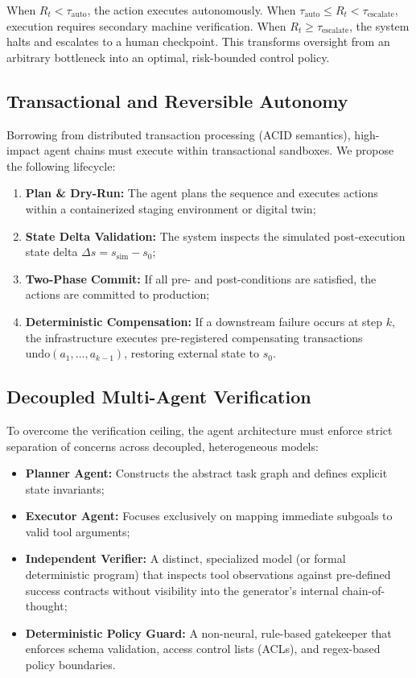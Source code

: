 \documentclass[conference]{IEEEtran}
\begin{document}
When $R_t < \tau_{\text{auto}}$, the action executes autonomously. When $\tau_{\text{auto}} \le R_t < \tau_{\text{escalate}}$, execution requires secondary machine verification. When $R_t \ge \tau_{\text{escalate}}$, the system halts and escalates to a human checkpoint. This transforms oversight from an arbitrary bottleneck into an optimal, risk-bounded control policy.

\subsection{Transactional and Reversible Autonomy}
Borrowing from distributed transaction processing (ACID semantics), high-impact agent chains must execute within transactional sandboxes. We propose the following lifecycle:
\begin{enumerate}
    \item \textbf{Plan \& Dry-Run:} The agent plans the sequence and executes actions within a containerized staging environment or digital twin;
    \item \textbf{State Delta Validation:} The system inspects the simulated post-execution state delta $\Delta s = s_{\text{sim}} - s_0$;
    \item \textbf{Two-Phase Commit:} If all pre- and post-conditions are satisfied, the actions are committed to production;
    \item \textbf{Deterministic Compensation:} If a downstream failure occurs at step $k$, the infrastructure executes pre-registered compensating transactions $\text{undo}(a_1, \dots, a_{k-1})$, restoring external state to $s_0$.
\end{enumerate}

\subsection{Decoupled Multi-Agent Verification}
To overcome the verification ceiling, the agent architecture must enforce strict separation of concerns across decoupled, heterogeneous models:
\begin{itemize}
    \item \textbf{Planner Agent:} Constructs the abstract task graph and defines explicit state invariants;
    \item \textbf{Executor Agent:} Focuses exclusively on mapping immediate subgoals to valid tool arguments;
    \item \textbf{Independent Verifier:} A distinct, specialized model (or formal deterministic program) that inspects tool observations against pre-defined success contracts without visibility into the generator's internal chain-of-thought;
    \item \textbf{Deterministic Policy Guard:} A non-neural, rule-based gatekeeper that enforces schema validation, access control lists (ACLs), and regex-based policy boundaries.
\end{itemize}
\end{document}
